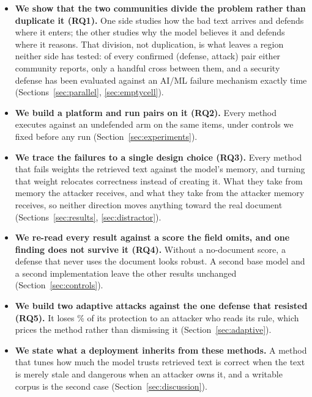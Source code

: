 \begin{itemize}
\item \textbf{We show that the two communities divide the problem rather than
  duplicate it (RQ1).} One side studies how the bad text arrives and defends
  where it enters; the other studies why the model believes it and defends
  where it reasons. That division, not duplication, is what leaves a region
  neither side has tested: of every confirmed (defense, attack) pair either
  community reports, only a handful cross between them, and a security
  defense has been evaluated against an AI/ML failure mechanism exactly
  \NSecDefVsSafetyAttack{} time (Sections~\ref{sec:parallel},
  \ref{sec:emptycell}).

\item \textbf{We build a platform and run \NCampaignPairs{} pairs on it
  (RQ2).} Every method executes against an undefended arm on the same items,
  under controls we fixed before any run (Section~\ref{sec:experiments}).

\item \textbf{We trace the failures to a single design choice (RQ3).}
  Every method that fails weights the retrieved text against the model's
  memory, and turning that weight relocates correctness instead of creating
  it. What they take from memory the attacker receives,
  and what they take from the attacker memory receives, so neither direction
  moves anything toward the real document (Sections~\ref{sec:results},
  \ref{sec:distractor}).

\item \textbf{We re-read every result against a score the field omits,
  and one finding does not survive it (RQ4).} Without a no-document score, a
  defense that never uses the document looks robust. A second base model and
  a second implementation leave the other results unchanged
  (Section~\ref{sec:controls}).

\item \textbf{We build two adaptive attacks against the one defense that
  resisted (RQ5).} It loses \PctAcdRemovedGradient{}\% of its
  protection to an attacker who reads its rule, which prices the method rather
  than dismissing it (Section~\ref{sec:adaptive}).

\item \textbf{We state what a deployment inherits from these methods.} A
  method that tunes how much the model trusts retrieved text is correct when
  the text is merely stale and dangerous when an attacker owns it, and a
  writable corpus is the second case (Section~\ref{sec:discussion}).


\end{itemize}
